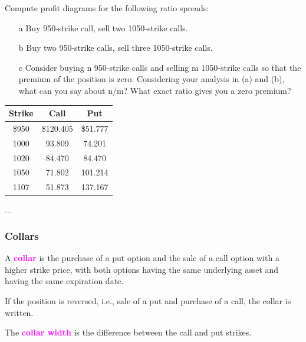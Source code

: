 \begin{frame}[fragile,t]
	\begin{myexample}[(Problem 3.15)]
	Compute profit diagrams for the following ratio spreads:
	\begin{itemize}
		\item[a] Buy 950-strike call, sell two 1050-strike calls.
		\item[b] Buy two 950-strike calls, sell three 1050-strike calls.
		\item[c] Consider buying n 950-strike calls and selling m 1050-strike calls so that the premium of the position is zero. Considering your analysis in (a) and (b), what can you say about n/m? What exact ratio gives you a zero premium?
	\end{itemize}
	\begin{center}
\renewcommand{\arraystretch}{1.2}
		\begin{tabular}{|c|c|c|}
		\hline
		Strike & Call      & Put      \\ \hline
		\$950  & \$120.405 & \$51.777 \\
		1000   & 93.809    & 74.201   \\
		1020   & 84.470    & 84.470   \\
		1050   & 71.802    & 101.214  \\
		1107   & 51.873    & 137.167  \\ \hline
		\end{tabular}
	\end{center}
	\end{myexample}
	\pause
	\begin{mysol}
		\textcolor{gray}{...}	\myEnd
	\end{mysol}
\end{frame}
\begin{frame}[fragile,t]
	\frametitle{Collars}

	A \textcolor{magenta}{\bf collar} is the purchase of a put option and the sale of a call option with
	a higher strike price, with both options having the same underlying asset and having the same
	expiration date.

	\bigskip

	If the position is reversed, i.e., sale of a put and purchase of a call, the collar is written.

	\bigskip

	The \textcolor{magenta}{\bf collar width} is the difference between the call and put strikes.
\end{frame}
